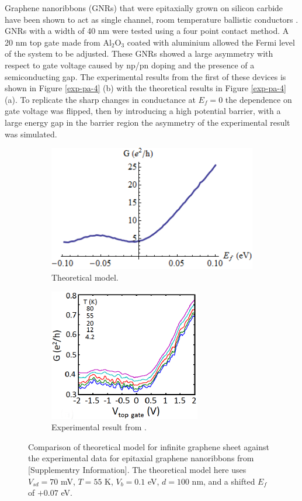 		Graphene nanoribbons (GNRs) that were epitaxially grown on silicon carbide have been shown to act as single channel, room temperature ballistic conductors  \cite{b19}. GNRs with a width of 40 nm were tested using a four point contact method. A 20 nm top gate made from Al$_{2}$O$_{3}$ coated with aluminium allowed the Fermi level of the system to be adjusted. These GNRs showed a large asymmetry with respect to gate voltage caused by np/pn doping and the presence of a semiconducting gap. The experimental results from the first of these devices is shown in Figure \ref{exp-pa-4} (b) with the theoretical results in Figure \ref{exp-pa-4} (a). To replicate the sharp changes in conductance at $E_{f}=0$ the dependence on gate voltage was flipped, then by introducing a high potential barrier, with a large energy gap in the barrier region the asymmetry of the experimental result was simulated.

		\begin{figure}[h]
			\begin{subfigure}{0.45\textwidth}
				\centerline{\includegraphics[scale=0.5]{images/exp-a-1}}
				\caption{Theoretical model.}
			\end{subfigure}
			\hspace{1cm}
			\begin{subfigure}{0.45\textwidth}
				\centerline{\includegraphics[scale=0.7]{images/exp-pa-1}}
				\caption{Experimental result from \cite{b19}.}
			\end{subfigure}
			\caption{Comparison of theoretical model for infinite graphene sheet against the experimental data for epitaxial graphene nanoribbons  from \cite{b19}[Supplementry Information]. The theoretical model here uses $V_{sd}=70$ mV, $T=55$ K, $V_{b}=0.1$ eV, $d=100$ nm, and a shifted $E_{f}$ of $+0.07$ eV.}
			\label{exp-pa-1}
		\end{figure}

